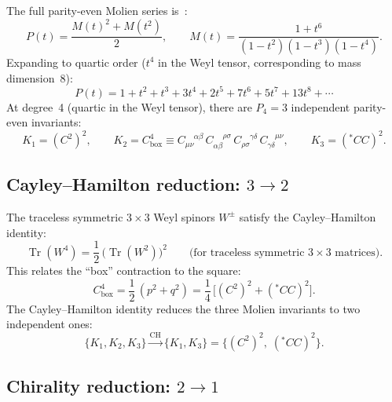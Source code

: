 \documentclass[12pt,a4paper]{article}
\theoremstyle{definition}
\theoremstyle{remark}
\newcommand{\Tr}{\operatorname{Tr}}
\begin{document}
The full parity-even Molien series is~\cite{Fulling:1992vm}:
\begin{equation}\label{eq:molien}
  P(t) = \frac{M(t)^2 + M(t^2)}{2}, \qquad
  M(t) = \frac{1 + t^6}{(1-t^2)(1-t^3)(1-t^4)}.
\end{equation}
Expanding to quartic order ($t^4$ in the Weyl tensor, corresponding to
mass dimension~8):
\begin{equation}
  P(t) = 1 + t^2 + t^3 + 3t^4 + 2t^5 + 7t^6 + 5t^7 + 13t^8 + \cdots
\end{equation}
At degree~4 (quartic in the Weyl tensor), there are $P_4 = 3$ independent
parity-even invariants:
\begin{equation}\label{eq:three-invariants}
  K_1 = (C^2)^2, \qquad
  K_2 = C^4_{\mathrm{box}}
  \equiv C_{\mu\nu}^{\phantom{\mu\nu}\alpha\beta}\,
  C_{\alpha\beta}^{\phantom{\alpha\beta}\rho\sigma}\,
  C_{\rho\sigma}^{\phantom{\rho\sigma}\gamma\delta}\,
  C_{\gamma\delta}^{\phantom{\gamma\delta}\mu\nu}, \qquad
  K_3 = ({}^{\ast}\!CC)^2.
\end{equation}

\subsection{Cayley--Hamilton reduction: \texorpdfstring{$3 \to 2$}{3 to 2}}

The traceless symmetric $3 \times 3$ Weyl spinors $W^\pm$ satisfy the
Cayley--Hamilton identity:
\begin{equation}\label{eq:CH}
  \Tr(W^4) = \frac{1}{2}\,\bigl(\Tr(W^2)\bigr)^2
  \qquad\text{(for traceless symmetric $3 \times 3$ matrices)}.
\end{equation}
This relates the ``box'' contraction to the square:
\begin{equation}\label{eq:box-reduce}
  C^4_{\mathrm{box}} = \frac{1}{2}\,(p^2 + q^2)
  = \frac{1}{4}\,\bigl[(C^2)^2 + ({}^{\ast}\!CC)^2\bigr].
\end{equation}
The Cayley--Hamilton identity reduces the three Molien invariants to two
independent ones:
\begin{equation}
  \{K_1, K_2, K_3\}
  \xrightarrow{\text{CH}} \{K_1, K_3\}
  = \{(C^2)^2,\; ({}^{\ast}\!CC)^2\}.
\end{equation}

\subsection{Chirality reduction: \texorpdfstring{$2 \to 1$}{2 to 1}}
\end{document}
